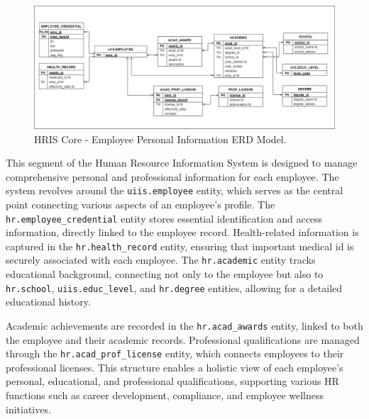     \begin{figure}[H]
        \centering
        \includegraphics[width=1\linewidth]{figures/images/diagrams/erd/erd-core-emp-personal-info.png}
        \caption{HRIS Core - Employee Personal Information ERD Model.}
        \label{fig:erd-core-emp-personal-info}
    \end{figure}

    This segment of the Human Resource Information System is designed to manage comprehensive personal and professional information for each employee. The system revolves around the \texttt{uiis.employee} entity, which serves as the central point connecting various aspects of an employee's profile. The \texttt{hr.employee\_credential} entity stores essential identification and access information, directly linked to the employee record. Health-related information is captured in the \texttt{hr.health\_record} entity, ensuring that important medical id is securely associated with each employee. The \texttt{hr.academic} entity tracks educational background, connecting not only to the employee but also to \texttt{hr.school}, \texttt{uiis.educ\_level}, and \texttt{hr.degree} entities, allowing for a detailed educational history. 
            
    Academic achievements are recorded in the \texttt{hr.acad\_awards} entity, linked to both the employee and their academic records. Professional qualifications are managed through the \texttt{hr.acad\_prof\_license} entity, which connects employees to their professional licenses. This structure enables a holistic view of each employee's personal, educational, and professional qualifications, supporting various HR functions such as career development, compliance, and employee wellness initiatives.

